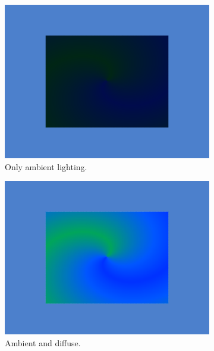 \documentclass[a4paper]{article}
\begin{document}
    \begin{figure}[H]
        \centering
        \hfill
        \begin{subfigure}{.32\linewidth}%
            \includegraphics[width=\linewidth]{ambient}
            \caption{Only ambient lighting.}
        \end{subfigure}
        \begin{subfigure}{.32\linewidth}%
            \includegraphics[width=\linewidth]{diffuse}
            \caption{Ambient and diffuse.}
        \end{subfigure}
        \begin{subfigure}{.32\linewidth}%

\end{subfigure}
\end{figure}
\end{document}

